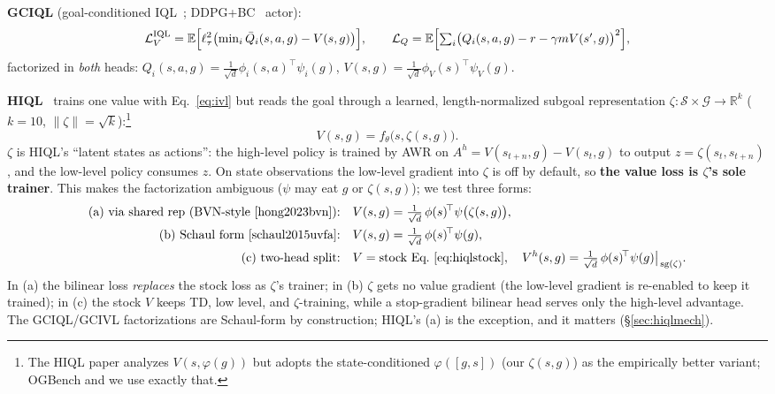 \documentclass[11pt]{article}
\newcommand{\B}[1]{\textbf{#1}}
\begin{document}
\B{GCIQL} (goal-conditioned IQL~\cite{kostrikov2022iql}; DDPG+BC~\cite{fujimoto2021td3bc} actor):
\begin{equation}
\mathcal{L}_{V}^{\text{IQL}}
=\mathbb{E}\Bigl[\ell^2_\tau\bigl(\textstyle\min_i\bar Q_i(s,a,g)-V(s,g)\bigr)\Bigr],
\qquad
\mathcal{L}_{Q}
=\mathbb{E}\Bigl[\textstyle\sum_{i}\bigl(Q_i(s,a,g)-r-\gamma m V(s',g)\bigr)^{2}\Bigr],
\label{eq:iql}
\end{equation}
factorized in \emph{both} heads:
$Q_i(s,a,g)=\tfrac{1}{\sqrt d}\phi_i(s,a)^{\!\top}\psi_i(g)$,
$V(s,g)=\tfrac{1}{\sqrt d}\phi_V(s)^{\!\top}\psi_V(g)$.

\B{HIQL}~\cite{park2023hiql} trains one value with Eq.~\eqref{eq:ivl} but reads
the goal through a learned, length-normalized subgoal representation
$\zeta:\mathcal{S}\times\mathcal{G}\to\mathbb{R}^k$ ($k{=}10$,
$\|\zeta\|=\sqrt k$):\footnote{The HIQL paper analyzes $V(s,\varphi(g))$ but
adopts the state-conditioned $\varphi([g,s])$ (our $\zeta(s,g)$) as the
empirically better variant; OGBench and we use exactly that.}
\begin{equation}
V(s,g)=f_\theta\bigl(s,\zeta(s,g)\bigr).
\label{eq:hiqlstock}
\end{equation}
$\zeta$ is HIQL's ``latent states as actions'': the high-level policy is trained
by AWR on $A^{h}=V(s_{t+n},g)-V(s_t,g)$ to output $z=\zeta(s_t,s_{t+n})$, and the
low-level policy consumes $z$. On state observations the low-level gradient into
$\zeta$ is off by default, so \B{the value loss is $\zeta$'s sole trainer}. This
makes the factorization ambiguous ($\psi$ may eat $g$ or $\zeta(s,g)$); we test
three forms:
\begin{align}
\text{(a) via shared rep (BVN-style~\cite{hong2023bvn}):}\quad
& V(s,g) = \tfrac{1}{\sqrt d}\,\phi(s)^{\!\top}\psi\bigl(\zeta(s,g)\bigr),
\label{eq:hiqlrep}\\
\text{(b) Schaul form~\cite{schaul2015uvfa}:}\quad
& V(s,g) = \tfrac{1}{\sqrt d}\,\phi(s)^{\!\top}\psi(g),
\label{eq:hiqlschaul}\\
\text{(c) two-head split:}\quad
& V = \text{stock Eq.~\eqref{eq:hiqlstock}}, \quad
V^{h}(s,g) = \tfrac{1}{\sqrt d}\,\phi(s)^{\!\top}
\psi(g)\big|_{\,\mathrm{sg}(\zeta)}.
\label{eq:hiqlsplit}
\end{align}
In (a) the bilinear loss \emph{replaces} the stock loss as $\zeta$'s trainer; in
(b) $\zeta$ gets no value gradient (the low-level gradient is re-enabled to keep
it trained); in (c) the stock $V$ keeps TD, low level, and $\zeta$-training,
while a stop-gradient bilinear head serves only the high-level advantage. The
GCIQL/GCIVL factorizations are Schaul-form by construction; HIQL's (a) is the
exception, and it matters (\S\ref{sec:hiqlmech}).
\end{document}
